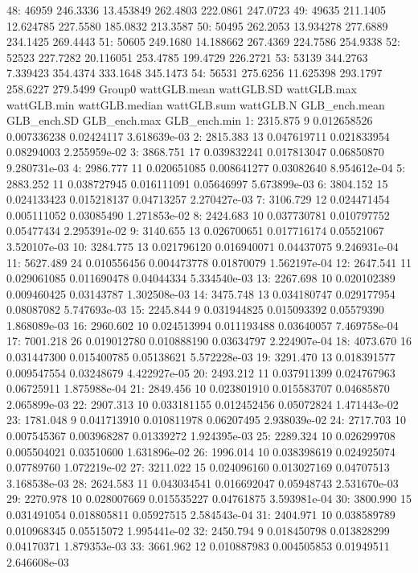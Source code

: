 \documentclass[
  10pt,
  a4paper,oneside]{article}
\begin{document}
48: 46959 246.3336 13.453849 262.4803 222.0861 247.0723
49: 49635 211.1405 12.624785 227.5580 185.0832 213.3587
50: 50495 262.2053 13.934278 277.6889 234.1425 269.4443
51: 50605 249.1680 14.188662 267.4369 224.7586 254.9338
52: 52523 227.7282 20.116051 253.4785 199.4729 226.2721
53: 53139 344.2763 7.339423 354.4374 333.1648 345.1473
54: 56531 275.6256 11.625398 293.1797 258.6227 279.5499
Group0 wattGLB.mean wattGLB.SD wattGLB.max wattGLB.min wattGLB.median
wattGLB.sum wattGLB.N GLB\_ench.mean GLB\_ench.SD GLB\_ench.max GLB\_ench.min
1: 2315.875 9 0.012658526 0.007336238 0.02424117 3.618639e-03
2: 2815.383 13 0.047619711 0.021833954 0.08294003 2.255959e-02
3: 3868.751 17 0.039832241 0.017813047 0.06850870 9.280731e-03
4: 2986.777 11 0.020651085 0.008641277 0.03082640 8.954612e-04
5: 2883.252 11 0.038727945 0.016111091 0.05646997 5.673899e-03
6: 3804.152 15 0.024133423 0.015218137 0.04713257 2.270427e-03
7: 3106.729 12 0.024471454 0.005111052 0.03085490 1.271853e-02
8: 2424.683 10 0.037730781 0.010797752 0.05477434 2.295391e-02
9: 3140.655 13 0.026700651 0.017716174 0.05521067 3.520107e-03
10: 3284.775 13 0.021796120 0.016940071 0.04437075 9.246931e-04
11: 5627.489 24 0.010556456 0.004473778 0.01870079 1.562197e-04
12: 2647.541 11 0.029061085 0.011690478 0.04044334 5.334540e-03
13: 2267.698 10 0.020102389 0.009460425 0.03143787 1.302508e-03
14: 3475.748 13 0.034180747 0.029177954 0.08087082 5.747693e-03
15: 2245.844 9 0.031944825 0.015093392 0.05579390 1.868089e-03
16: 2960.602 10 0.024513994 0.011193488 0.03640057 7.469758e-04
17: 7001.218 26 0.019012780 0.010888190 0.03634797 2.224907e-04
18: 4073.670 16 0.031447300 0.015400785 0.05138621 5.572228e-03
19: 3291.470 13 0.018391577 0.009547554 0.03248679 4.422927e-05
20: 2493.212 11 0.037911399 0.024767963 0.06725911 1.875988e-04
21: 2849.456 10 0.023801910 0.015583707 0.04685870 2.065899e-03
22: 2907.313 10 0.033181155 0.012452456 0.05072824 1.471443e-02
23: 1781.048 9 0.041713910 0.010811978 0.06207495 2.938039e-02
24: 2717.703 10 0.007545367 0.003968287 0.01339272 1.924395e-03
25: 2289.324 10 0.026299708 0.005504021 0.03510600 1.631896e-02
26: 1996.014 10 0.038398619 0.024925074 0.07789760 1.072219e-02
27: 3211.022 15 0.024096160 0.013027169 0.04707513 3.168538e-03
28: 2624.583 11 0.043034541 0.016692047 0.05948743 2.531670e-03
29: 2270.978 10 0.028007669 0.015535227 0.04761875 3.593981e-04
30: 3800.990 15 0.031491054 0.018805811 0.05927515 2.584543e-04
31: 2404.971 10 0.038589789 0.010968345 0.05515072 1.995441e-02
32: 2450.794 9 0.018450798 0.013828299 0.04170371 1.879353e-03
33: 3661.962 12 0.010887983 0.004505853 0.01949511 2.646608e-03
\end{document}
